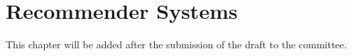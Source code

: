 \chapter{Recommender Systems}
\label{ch:recsys}

    This chapter will be added after the submission of the draft to the committee.

